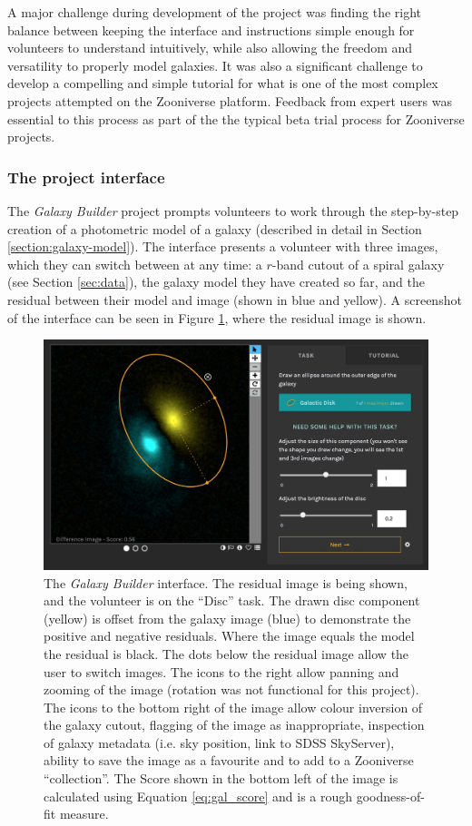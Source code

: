 \documentclass[../main.tex]{subfiles}
\begin{document}
A major challenge during development of the project was finding the right balance between keeping the interface and instructions simple enough for volunteers to understand intuitively, while also allowing the freedom and versatility to properly model galaxies. It was also a significant challenge to develop a compelling and simple tutorial for what is one of the most complex projects attempted on the Zooniverse platform. Feedback from expert users was essential to this process as part of the the typical beta trial process for Zooniverse projects.


\subsubsection{The project interface}

The \textit{Galaxy Builder} project prompts volunteers to work through the step-by-step creation of a photometric model of a galaxy (described in detail in Section \ref{section:galaxy-model}). The interface presents a volunteer with three images, which they can switch between at any time: a $r$-band cutout of a spiral galaxy (see Section \ref{sec:data}), the galaxy model they have created so far, and the residual between their model and image (shown in blue and yellow). A screenshot of the interface can be seen in Figure \ref{fig:interfaceInProgress}, where the residual image is shown.

\begin{figure}
  \includegraphics[width=17.7cm]{images/interfaceInProgress.jpg}
  \caption{The \textit{Galaxy Builder} interface. The residual image is being shown, and the volunteer is on the ``Disc'' task. The drawn disc component (yellow) is offset from the galaxy image (blue) to demonstrate the positive and negative residuals. Where the image equals the model the residual is black. The dots below the residual image allow the user to switch images. The icons to the right allow panning and zooming of the image (rotation was not functional for this project). The icons to the bottom right of the image allow colour inversion of the galaxy cutout, flagging of the image as inappropriate, inspection of galaxy metadata (i.e. sky position, link to SDSS SkyServer), ability to save the image as a favourite and to add to a Zooniverse ``collection''. The Score shown in the bottom left of the image is calculated using Equation \ref{eq:gal_score} and is a rough goodness-of-fit measure.}
  \label{fig:interfaceInProgress}
\end{figure}
\end{document}
